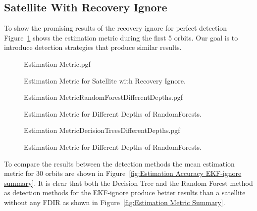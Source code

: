 \documentclass[letterpaper, 10 pt, conference]{ieeeconf}  %
\begin{document}
\subsection{Satellite With Recovery Ignore}
To show the promising results of the recovery ignore for perfect detection Figure~\ref{fig:Estimation Accuracy EKF-ignore} shows the estimation metric during the first 5 orbits. Our goal is to introduce detection strategies that produce similar results.

\begin{figure}[!htb]
	\begin{center}
		{Estimation Metric.pgf}
	\end{center}
	\caption[Estimation Metric for Satellite with Recovery Ignore]{Estimation Metric for Satellite with Recovery Ignore.}
	\label{fig:Estimation Accuracy EKF-ignore}
\end{figure}


\begin{figure}[!htb]
	\begin{center}
		{Estimation MetricRandomForestDifferentDepths.pgf}
	\end{center}
	\caption[Estimation Metric for Different Depths of RandomForests]{Estimation Metric for Different Depths of RandomForests.}
	\label{fig:Estimation Accuracy EKF-ignore RandomForest depth}
\end{figure}

\begin{figure}[!htb]
	\begin{center}
		{Estimation MetricDecisionTreesDifferentDepths.pgf}
	\end{center}
	\caption[Estimation Metric for Different Depths of RandomForests]{Estimation Metric for Different Depths of RandomForests.}
	\label{fig:Estimation Accuracy EKF-ignore Decision Tree depth}
\end{figure}

To compare the results between the detection methods the mean estimation metric for 30 orbits are shown in Figure~\ref{fig:Estimation Accuracy EKF-ignore summary}. It is clear that both the Decision Tree and the Random Forest method as detection methods for the EKF-ignore produce better results than a satellite without any FDIR as shown in Figure~\ref{fig:Estimation Metric Summary}. 
\end{document}

